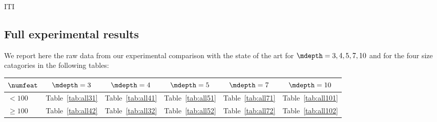 \documentclass{article}
\begin{document}
\begin{table}[htbp]
\begin{center}
\begin{footnotesize}
\tabcolsep=10pt

\end{footnotesize}
\end{center}
\caption{\label{tab:iti} ITI}
\end{table}


\subsection{Full experimental results}
\label{appendix:full}

We report here the raw data from our experimental comparison with the state of the art for $\mdepth=3,4,5,7,10$ and for the four size catagories in the following tables:

\tabcolsep=10pt


\begin{center}
	\def\arraystretch{1.25}
\begin{tabular}{lccccc}
	\toprule
	$\numfeat$& $\mdepth = 3$ & $\mdepth = 4$ & $\mdepth = 5$ & $\mdepth = 7$ & $\mdepth = 10$ \\
	 \midrule
	$< 100$ & Table~\ref{tab:all31} & Table~\ref{tab:all41} & Table~\ref{tab:all51} & Table~\ref{tab:all71} & Table~\ref{tab:all101} \\
	$\geq 100$ & Table~\ref{tab:all42} & Table~\ref{tab:all32} & Table~\ref{tab:all52} & Table~\ref{tab:all72} & Table~\ref{tab:all102} \\
	\bottomrule 
\end{tabular}
\end{center}
\end{document}
